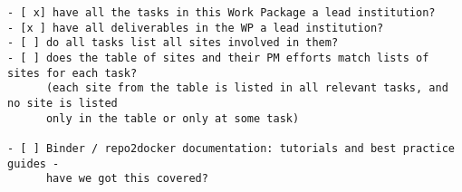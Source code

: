 \begin{draft}
\begin{verbatim}
- [ x] have all the tasks in this Work Package a lead institution?
- [x ] have all deliverables in the WP a lead institution?
- [ ] do all tasks list all sites involved in them?
- [ ] does the table of sites and their PM efforts match lists of sites for each task?
      (each site from the table is listed in all relevant tasks, and no site is listed
      only in the table or only at some task)

- [ ] Binder / repo2docker documentation: tutorials and best practice guides -
      have we got this covered?
\end{verbatim}
\end{draft}
